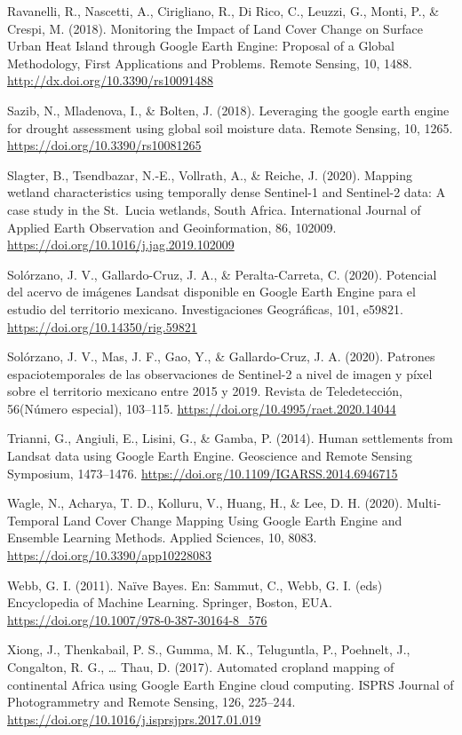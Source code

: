 \documentclass[
  12pt,
  letterpaper,
  twoside]{book}
\begin{document}
Ravanelli, R., Nascetti, A., Cirigliano, R., Di Rico, C., Leuzzi, G., Monti, P., \& Crespi, M. (2018). Monitoring the Impact of Land Cover Change on Surface Urban Heat Island through Google Earth Engine: Proposal of a Global Methodology, First Applications and Problems. Remote Sensing, 10, 1488. \url{http://dx.doi.org/10.3390/rs10091488}

Sazib, N., Mladenova, I., \& Bolten, J. (2018). Leveraging the google earth engine for drought assessment using global soil moisture data. Remote Sensing, 10, 1265. \url{https://doi.org/10.3390/rs10081265}

Slagter, B., Tsendbazar, N.-E., Vollrath, A., \& Reiche, J. (2020). Mapping wetland characteristics using temporally dense Sentinel-1 and Sentinel-2 data: A case study in the St.~Lucia wetlands, South Africa. International Journal of Applied Earth Observation and Geoinformation, 86, 102009. \url{https://doi.org/10.1016/j.jag.2019.102009}

Solórzano, J. V., Gallardo-Cruz, J. A., \& Peralta-Carreta, C. (2020). Potencial del acervo de imágenes Landsat disponible en Google Earth Engine para el estudio del territorio mexicano. Investigaciones Geográficas, 101, e59821. \url{https://doi.org/10.14350/rig.59821}

Solórzano, J. V., Mas, J. F., Gao, Y., \& Gallardo-Cruz, J. A. (2020). Patrones espaciotemporales de las observaciones de Sentinel-2 a nivel de imagen y píxel sobre el territorio mexicano entre 2015 y 2019. Revista de Teledetección, 56(Número especial), 103--115. \url{https://doi.org/10.4995/raet.2020.14044}

Trianni, G., Angiuli, E., Lisini, G., \& Gamba, P. (2014). Human settlements from Landsat data using Google Earth Engine. Geoscience and Remote Sensing Symposium, 1473--1476. \url{https://doi.org/10.1109/IGARSS.2014.6946715}

Wagle, N., Acharya, T. D., Kolluru, V., Huang, H., \& Lee, D. H. (2020). Multi-Temporal Land Cover Change Mapping Using Google Earth Engine and Ensemble Learning Methods. Applied Sciences, 10, 8083. \url{https://doi.org/10.3390/app10228083}

Webb, G. I. (2011). Naïve Bayes. En: Sammut, C., Webb, G. I. (eds) Encyclopedia of Machine Learning. Springer, Boston, EUA. \url{https://doi.org/10.1007/978-0-387-30164-8_576}

Xiong, J., Thenkabail, P. S., Gumma, M. K., Teluguntla, P., Poehnelt, J., Congalton, R. G., \ldots{} Thau, D. (2017). Automated cropland mapping of continental Africa using Google Earth Engine cloud computing. ISPRS Journal of Photogrammetry and Remote Sensing, 126, 225--244. \url{https://doi.org/10.1016/j.isprsjprs.2017.01.019}
\end{document}
